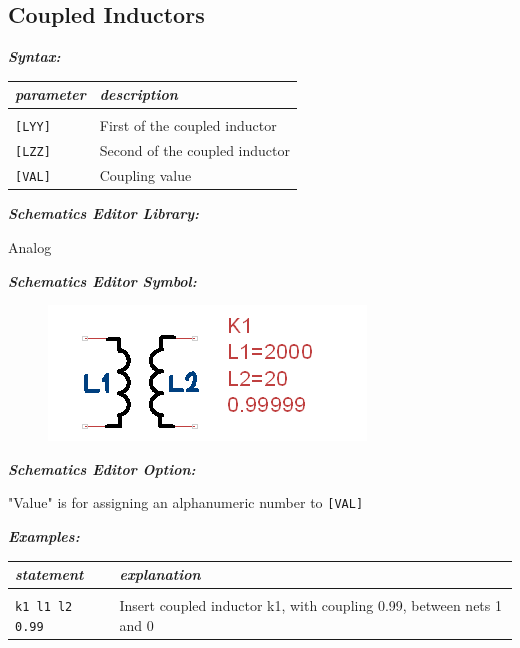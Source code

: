 \newpage
\subsection{Coupled Inductors}
\label{subsec_sceadm_coupledinductors}

\textbf{\textit{Syntax:}}


\begin{longtable}{l l}
\textit{parameter} & \textit{description} \\ \hline \\ \vspace{-0.8\parskip}
\texttt{[LYY]} & First of the coupled inductor \\
\texttt{[LZZ]} & Second of the coupled inductor \\
\texttt{[VAL]} & Coupling value \\ 
\end{longtable}


\textbf{\textit{Schematics Editor Library:}}

Analog

\textbf{\textit{Schematics Editor Symbol:}}

\begin{figure}[htb]
  \begin{center}
    \includegraphics[height=0.08\textheight]{./pics/SpiceEl/CInductor.png}
  \end{center}
\end{figure}

\textbf{\textit{Schematics Editor Option:}}

"\textsf{Value}" is for assigning an alphanumeric number to \texttt{[VAL]}

\textbf{\textit{Examples:}}

\begin{longtable}{l l}
\textit{statement} & \textit{explanation} \\ \hline \\ \vspace{-0.8\parskip} 
\begin{minipage}{15em}\texttt{k1 l1 l2 0.99}\end{minipage} & 
\begin{minipage}{15em}{\small Insert coupled inductor k1, with coupling 0.99, between nets 1 and 0}\end{minipage} \\
\end{longtable}



